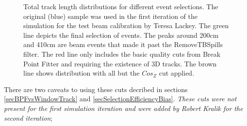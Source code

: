 \documentclass[12pt]{article}
\begin{document}
\begin{enumerate}
\begin{figure}

\caption{Total track length distributions for different event selections. The original (blue) sample was used in the first iteration of the simulation for the test beam calibration by Teresa Lackey. The green line depicts the final selection of events. The peaks around 200cm and 410cm are beam events that made it past the RemoveTBSpills filter. The red line only includes the basic quality cuts from Break Point Fitter and requiring the existence of 3D tracks. The brown line shows distribution with all but the $Cos_Z$ cut applied.}
\label{figCosZSelectionComparison}
\end{figure}

There are two caveats to using these cuts decribed in sections \ref{secBPFvsWindowTrack} and \ref{secSelectionEfficiencyBias}. \textit{These cuts were not present for the first simulation iteration and were added by Robert Kralik for the second iteration};
\end{enumerate}
\end{document}
